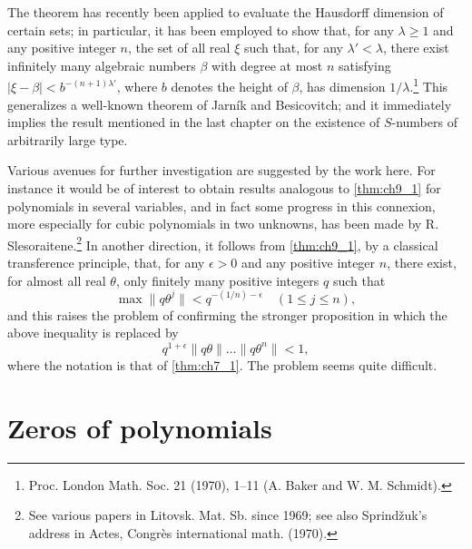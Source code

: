 The theorem has recently been applied to evaluate the Hausdorff dimension of certain sets; in particular, it has been employed to show that, for any $\lambda \geq 1$ and any positive integer $n$, the set of all real $\xi$ such that, for any $\lambda' < \lambda$, there exist infinitely many algebraic numbers $\beta$ with degree at most $n$ satisfying $|\xi - \beta| < b^{-(n+1)\lambda'}$, where $b$ denotes the height of $\beta$, has dimension $1/\lambda$.\footnote{Proc. London Math. Soc. 21 (1970), 1--11 (A. Baker and W. M. Schmidt).} This generalizes a well-known theorem of Jarn\'{i}k and Besicovitch; and it immediately implies the result mentioned in the last chapter on the existence of $S$-numbers of arbitrarily large type.

Various avenues for further investigation are suggested by the work here. For instance it would be of interest to obtain results analogous to \autoref{thm:ch9_1} for polynomials in several variables, and in fact some progress in this connexion, more especially for cubic polynomials in two unknowns, has been made by R. Slesoraitene.\footnote{See various papers in Litovsk. Mat. Sb. since 1969; see also Sprind\v{z}uk's address in Actes, Congr\`{e}s international math. (1970).} In another direction, it follows from \autoref{thm:ch9_1}, by a classical transference principle, that, for any $\epsilon > 0$ and any positive integer $n$, there exist, for almost all real $\theta$, only finitely many positive integers $q$ such that
\[\max \|q\theta^j\| < q^{-(1/n)-\epsilon} \quad (1 \leqslant j \leqslant n),\]
and this raises the problem of confirming the stronger proposition in which the above inequality is replaced by
\[q^{1+\epsilon}\|q\theta\|\ldots\|q\theta^n\|<1,\]
where the notation is that of \autoref{thm:ch7_1}. The problem seems quite difficult.

\section{Zeros of polynomials}\label{sec:ch9_2}

